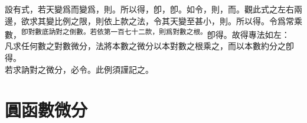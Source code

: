 \begin{enumerate} [label={第\chinese*款},nolistsep]
	設有式\CJKmove，若天變爲\CJKmove 而\CJKmove 變爲\CJKmove，則\CJKmove。所以得\CJKmove，卽\CJKmove，卽\CJKmove。如令\CJKmove，則\CJKmove，而\CJKmove。觀此式之左右兩邊，欲求其變比例之限，則依上款之法，令其天變至甚小，則\CJKmove。所以得\CJKmove。令爲常乘數，\textsuperscript{卽對數底訥對之倒數。若依第一百七十二款，則爲對數之根。}卽得\CJKmove。故得專法如左：\\
	凡求任何數之對數微分，法將本數之微分以本對數之根乘之，而以本數約分之卽得。\\
	若求訥對之微分，必令\CJKmove。此例須謹記之。
\end{enumerate}

\section{圓函數微分}


